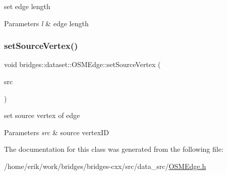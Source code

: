 set edge length


\begin{DoxyParams}{Parameters}
{\em l} & edge length \\
\hline
\end{DoxyParams}
\mbox{\label{classbridges_1_1dataset_1_1_o_s_m_edge_ac34db39ff9ef47f69042e9d6ab577112}} 
\subsubsection{\texorpdfstring{set\+Source\+Vertex()}{setSourceVertex()}}
{\footnotesize\ttfamily void bridges\+::dataset\+::\+O\+S\+M\+Edge\+::set\+Source\+Vertex (\begin{DoxyParamCaption}\item[{\hyperlink{classbridges_1_1dataset_1_1_o_s_m_vertex_ad166f13b0aefbdc05a273546f2a3bb96}{O\+S\+M\+Vertex\+::\+O\+S\+M\+Vertex\+ID}}]{src }\end{DoxyParamCaption})\hspace{0.3cm}{\ttfamily [inline]}}

set source vertex of edge


\begin{DoxyParams}{Parameters}
{\em src} & source vertex\+ID \\
\hline
\end{DoxyParams}


The documentation for this class was generated from the following file\+:\begin{DoxyCompactItemize}
\item 
/home/erik/work/bridges/bridges-\/cxx/src/data\+\_\+src/\hyperlink{_o_s_m_edge_8h}{O\+S\+M\+Edge.\+h}\end{DoxyCompactItemize}
